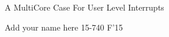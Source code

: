 \documentclass[11pt]{article}
\begin{document}
\vspace*{-5ex}\centerline{\Large A MultiCore Case For User Level Interrupts}
\vspace*{-.5ex}
\begin{center}
Add your name here
15-740 F'15
\end{center}











 

\end{document}
